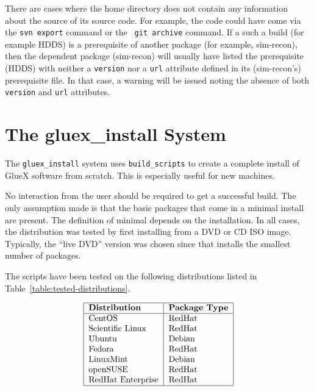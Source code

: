 \documentclass[12pt, letterpaper]{article}
\begin{document}
There are cases where the home directory does not contain any
information about the source of its source code. For example, the code
could have come via the {\tt svn\ export} command or the {\tt
  git\ archive} command. If a such a build (for example HDDS) is a
prerequisite of another package (for example, sim-recon), then the
dependent package (sim-recon) will usually have listed the
prerequisite (HDDS) with neither a {\tt version} nor a {\tt url}
attribute defined in its (sim-recon's) prerequisite file. In that
case, a warning will be issued noting the absence of both {\tt
  version} and {\tt url} attributes.

\section{The gluex\_install System}\label{gluex-install}

The {\tt gluex\_install} system uses {\tt build\_scripts} to create a
complete install of GlueX software from scratch. This is especially
useful for new machines.

No interaction from the user should be required to get a successful
build. The only assumption made is that the basic packages that come
in a minimal install are present. The definition of minimal
depends on the installation. In all cases, the distribution was tested
by first installing from a DVD or CD ISO image. Typically, the ``live
DVD'' version was chosen since that installs the smallest number of
packages.

The scripts have been tested on the following distributions listed in
Table~\ref{table:tested-distributions}.

\begin{table}
$$
\begin{tabular}{|l|l|}
\hline
\bf Distribution & \bf Package Type \\
\hline
CentOS & RedHat \\
Scientific Linux & RedHat \\
Ubuntu & Debian \\
Fedora & RedHat \\
LinuxMint & Debian \\
openSUSE & RedHat \\
RedHat Enterprise & RedHat \\
\hline
\end{tabular}
$$
\caption{Gluex\_install tested distributions.}\label{table:tested-distributions}
\end{table}
\end{document}

